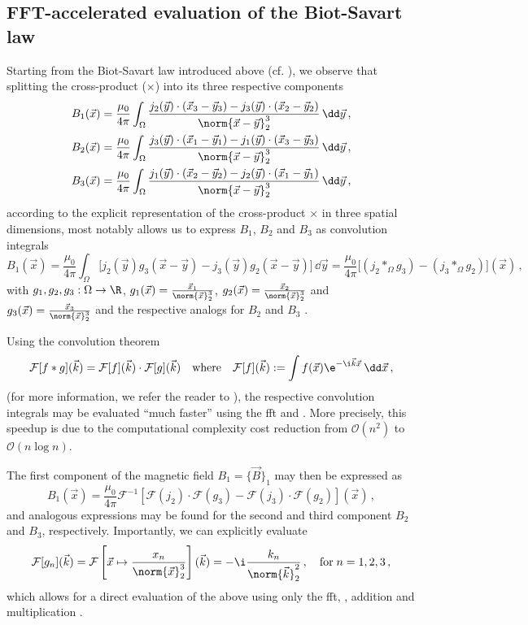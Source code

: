 \documentclass[12pt]{article}
\begin{document}
  \subsection{FFT-accelerated evaluation of the Biot-Savart law}
  Starting from the Biot-Savart law introduced above (cf. ), we observe that splitting the cross-product ($\times$) into its three respective components
  \begin{align*}
    B_1(\vec{x}) & = \frac{\mu_0}{4\pi} \int_{\Omega} \frac{j_2(\vec{y}) \cdot (\vec{x}_3 - \vec{y}_3) - j_3(\vec{y}) \cdot (\vec{x}_2 - \vec{y}_2)}{\norm{\vec{x} - \vec{y}}_2^3} \,\dd\vec{y} \,, \\
    B_2(\vec{x}) & = \frac{\mu_0}{4\pi} \int_{\Omega} \frac{j_3(\vec{y}) \cdot (\vec{x}_1 - \vec{y}_1) - j_1(\vec{y}) \cdot (\vec{x}_3 - \vec{y}_3)}{\norm{\vec{x} - \vec{y}}_2^3} \,\dd\vec{y} \,, \\
    B_3(\vec{x}) & = \frac{\mu_0}{4\pi} \int_{\Omega} \frac{j_1(\vec{y}) \cdot (\vec{x}_2 - \vec{y}_2) - j_2(\vec{y}) \cdot (\vec{x}_1 - \vec{y}_1)}{\norm{\vec{x} - \vec{y}}_2^3} \,\dd\vec{y} \,,
  \end{align*}
  according to the explicit representation of the cross-product $\times$ in three spatial dimensions, most notably allows us to express $B_1$, $B_2$ and $B_3$ as convolution integrals
  $$B_1(\vec{x}) = \frac{\mu_0}{4\pi} \int_{\Omega} \big[j_2(\vec{y}) g_3(\vec{x} - \vec{y}) - j_3(\vec{y}) g_2(\vec{x} - \vec{y})\big]\,\dd\vec{y} = \frac{\mu_0}{4\pi} \big[(j_2 *_{\Omega} g_3) - (j_3 *_{\Omega} g_2)\big](\vec{x})\,,$$
  with $g_1, g_2, g_3: \Omega \to \R$, $g_1(\vec{x}) = \frac{\vec{x}_1}{\norm{\vec{x}}_2^3}$, $g_2(\vec{x}) = \frac{\vec{x}_2}{\norm{\vec{x}}_2^3}$ and $g_3(\vec{x}) = \frac{\vec{x}_3}{\norm{\vec{x}}_2^3}$ and the respective analogs for $B_2$ and $B_3$ \parencite{2020-biot-savart-evaluation-fft}.

  Using the convolution theorem
  $$\mathcal{F}[f * g](\vec{k}) = \mathcal{F}[f](\vec{k}) \cdot \mathcal{F}[g](\vec{k}) \quad\text{where}\quad \mathcal{F}[f](\vec{k}) := \int f(\vec{x}) \e^{-\i \vec{k} \vec{x}}\,\dd\vec{x}\,,$$
  (for more information, we refer the reader to \cite{2022-convolution-theorem}), the respective convolution integrals may be evaluated ``much faster'' using the \gls{fft} and .
  More precisely, this speedup is due to the computational complexity cost reduction from $\mathcal{O}(n^2)$ to $\mathcal{O}(n \log n)$. %

  The first component of the magnetic field $B_1 = \{\vec{B}\}_1$ may then be expressed as
  $$B_1(\vec{x}) = \frac{\mu_0}{4\pi}\mathcal{F}^{-1}\left[\mathcal{F}(j_2) \cdot \mathcal{F}(g_3) - \mathcal{F}(j_3) \cdot \mathcal{F}(g_2)\right](\vec{x})\,,$$
  and analogous expressions may be found for the second and third component $B_2$ and $B_3$, respectively.
  Importantly, we can explicitly evaluate
  $$\mathcal{F}[g_n](\vec{k}) = \mathcal{F}\left[\vec{x} \mapsto \frac{x_n}{\norm{\vec{x}}_2^3}\right](\vec{k}) = -\i \frac{k_n}{\norm{\vec{k}}_2^2}\,, \quad\text{for}\; n=1,2,3\,,$$
  which allows for a direct evaluation of the above using only the \gls{fft}, , addition and multiplication \parencite{2020-biot-savart-evaluation-fft}.
\end{document}
